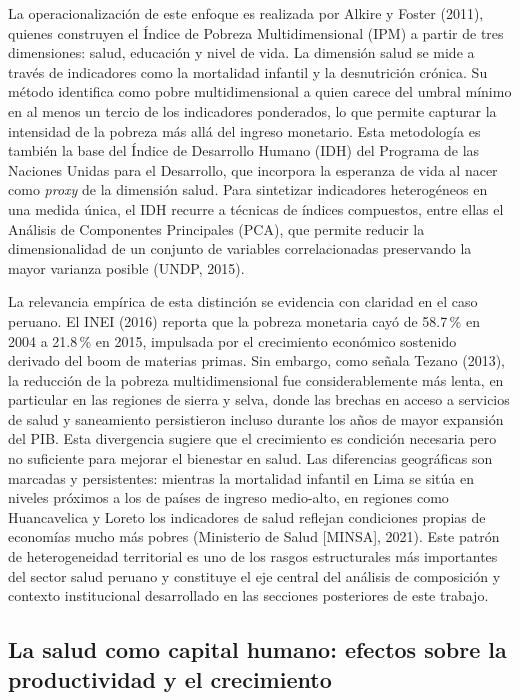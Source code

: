 \documentclass[12pt]{article}
\begin{document}
La operacionalización de este enfoque es realizada por Alkire y Foster (2011), quienes construyen
el Índice de Pobreza Multidimensional (IPM) a partir de tres dimensiones: salud, educación y nivel
de vida. La dimensión salud se mide a través de indicadores como la mortalidad infantil y la
desnutrición crónica. Su método identifica como pobre multidimensional a quien carece del umbral
mínimo en al menos un tercio de los indicadores ponderados, lo que permite capturar la intensidad
de la pobreza más allá del ingreso monetario. Esta metodología es también la base del Índice de
Desarrollo Humano (IDH) del Programa de las Naciones Unidas para el Desarrollo, que incorpora
la esperanza de vida al nacer como \textit{proxy} de la dimensión salud. Para sintetizar indicadores
heterogéneos en una medida única, el IDH recurre a técnicas de índices compuestos, entre ellas el
Análisis de Componentes Principales (PCA), que permite reducir la dimensionalidad de un conjunto
de variables correlacionadas preservando la mayor varianza posible (UNDP, 2015).

La relevancia empírica de esta distinción se evidencia con claridad en el caso peruano. El INEI
(2016) reporta que la pobreza monetaria cayó de 58.7\,\% en 2004 a 21.8\,\% en 2015, impulsada
por el crecimiento económico sostenido derivado del boom de materias primas. Sin embargo, como
señala Tezano (2013), la reducción de la pobreza multidimensional fue considerablemente más
lenta, en particular en las regiones de sierra y selva, donde las brechas en acceso a servicios de
salud y saneamiento persistieron incluso durante los años de mayor expansión del PIB. Esta
divergencia sugiere que el crecimiento es condición necesaria pero no suficiente para mejorar el
bienestar en salud. Las diferencias geográficas son marcadas y persistentes: mientras la mortalidad
infantil en Lima se sitúa en niveles próximos a los de países de ingreso medio-alto, en regiones
como Huancavelica y Loreto los indicadores de salud reflejan condiciones propias de economías
mucho más pobres (Ministerio de Salud [MINSA], 2021). Este patrón de heterogeneidad territorial
es uno de los rasgos estructurales más importantes del sector salud peruano y constituye el eje
central del análisis de composición y contexto institucional desarrollado en las secciones posteriores
de este trabajo.

\subsection{La salud como capital humano: efectos sobre la productividad y el crecimiento}
\end{document}
